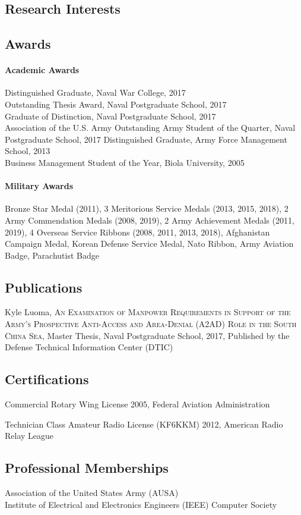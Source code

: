 \documentclass[12pt,letterpaper]{article}
\begin{document}
\subsection{Research Interests}
\subsection{Awards}
\paragraph{Academic Awards}
Distinguished Graduate, Naval War College, 2017\\
Outstanding Thesis Award, Naval Postgraduate School, 2017\\
Graduate of Distinction, Naval Postgraduate School, 2017\\
Association of the U.S. Army Outstanding Army Student of the Quarter, Naval Postgraduate School, 2017
Distinguished Graduate, Army Force Management School, 2013\\
Business Management Student of the Year, Biola University, 2005
\paragraph{Military Awards}
Bronze Star Medal (2011),
3 Meritorious Service Medals (2013, 2015, 2018),
2 Army Commendation Medals (2008, 2019),
2 Army Achievement Medals (2011, 2019), 4 Overseas Service Ribbons (2008, 2011, 2013, 2018), Afghanistan Campaign Medal, Korean Defense Service Medal, Nato Ribbon, Army Aviation Badge, Parachutist Badge
\subsection{Publications}
Kyle Luoma, \textsc{An Examination of Manpower Requirements in Support of the Army's Prospective Anti-Access and Area-Denial (A2AD) Role in the South China Sea}, 
Master Thesis, Naval Postgraduate School, 2017, Published by the Defense Technical Information Center (DTIC)\par
\subsection{Certifications}
Commercial Rotary Wing License 2005, Federal Aviation Administration

Technician Class Amateur Radio License (KF6KKM) 2012, American Radio Relay League

\subsection{Professional Memberships}
Association of the United States Army (AUSA)\\
Institute of Electrical and Electronics Engineers (IEEE) Computer Society
\end{document}
